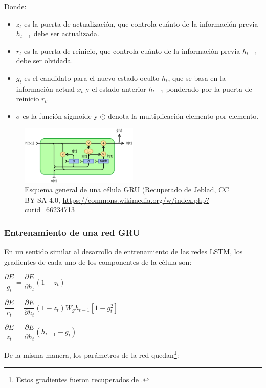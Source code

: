 Donde:
\begin{itemize}
    \item $z_t$ es la puerta de actualización, que controla cuánto de la información previa $h_{t-1}$ debe ser actualizada.
    \item $r_t$ es la puerta de reinicio, que controla cuánto de la información previa $h_{t-1}$ debe ser olvidada.
    \item $g_t$ es el candidato para el nuevo estado oculto $h_t$, que se basa en la información actual $x_t$ y el estado anterior $h_{t-1}$ ponderado por la puerta de reinicio $r_t$.
    \item $\sigma$ es la función sigmoide y $\odot$ denota la multiplicación elemento por elemento.
\end{itemize}

\begin{figure}[h]
    \centering
    \includegraphics[width=0.5\textwidth]{Figuras/redes_neuronales/diagrama_celda_GRU.png}
    \caption{Esquema general de una célula GRU (Recuperado de Jeblad, CC BY-SA 4.0, \url{https://commons.wikimedia.org/w/index.php?curid=66234713}} 
    \label{fig:diagrama_GRU}
\end{figure}

\subsubsection{Entrenamiento de una red GRU}

En un sentido similar al desarrollo de entrenamiento de las redes LSTM, los gradientes de cada uno de los componentes de la célula son:

\begin{center}
    $\dfrac{\partial E}{g_t} = \dfrac{\partial E}{\partial h_t}(1-z_t)$
    
    $\dfrac{\partial E}{r_t} = \dfrac{\partial E}{\partial h_t}(1-z_t) W_g  h_{t-1} [1-g_t^2]$

    $\dfrac{\partial E}{z_t} = \dfrac{\partial E}{\partial h_t}(h_{t-1} - g_t)$
\end{center}

De la misma manera, los parámetros de la red quedan\footnote{Estos gradientes fueron recuperados de \cite{forward_and_Backprop_GRU_Mihir}.}:


